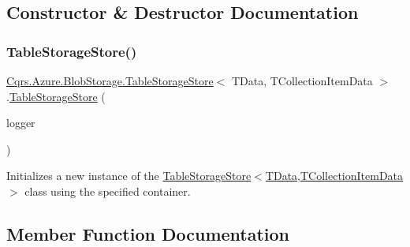 \subsection{Constructor \& Destructor Documentation}
\mbox{\label{classCqrs_1_1Azure_1_1BlobStorage_1_1TableStorageStore_aabc36bc46ffb22b716cc7769a641cfab_aabc36bc46ffb22b716cc7769a641cfab}} 
\subsubsection{\texorpdfstring{Table\+Storage\+Store()}{TableStorageStore()}}
{\footnotesize\ttfamily \hyperlink{classCqrs_1_1Azure_1_1BlobStorage_1_1TableStorageStore}{Cqrs.\+Azure.\+Blob\+Storage.\+Table\+Storage\+Store}$<$ T\+Data, T\+Collection\+Item\+Data $>$.\hyperlink{classCqrs_1_1Azure_1_1BlobStorage_1_1TableStorageStore}{Table\+Storage\+Store} (\begin{DoxyParamCaption}\item[{I\+Logger}]{logger }\end{DoxyParamCaption})\hspace{0.3cm}{\ttfamily [protected]}}



Initializes a new instance of the \hyperlink{classCqrs_1_1Azure_1_1BlobStorage_1_1TableStorageStore_aabc36bc46ffb22b716cc7769a641cfab_aabc36bc46ffb22b716cc7769a641cfab}{Table\+Storage\+Store$<$\+T\+Data,\+T\+Collection\+Item\+Data$>$} class using the specified container. 



\subsection{Member Function Documentation}
\mbox{\label{classCqrs_1_1Azure_1_1BlobStorage_1_1TableStorageStore_ad9becfb4b149c645450deba342696e54_ad9becfb4b149c645450deba342696e54}} 
